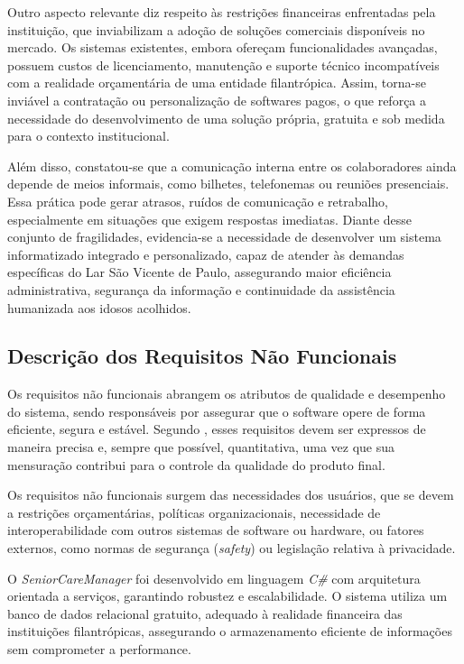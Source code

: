 Outro aspecto relevante diz respeito às restrições financeiras enfrentadas pela instituição, que inviabilizam a adoção de soluções comerciais disponíveis no mercado. Os sistemas existentes, embora ofereçam funcionalidades avançadas, possuem custos de licenciamento, manutenção e suporte técnico incompatíveis com a realidade orçamentária de uma entidade filantrópica. Assim, torna-se inviável a contratação ou personalização de softwares pagos, o que reforça a necessidade do desenvolvimento de uma solução própria, gratuita e sob medida para o contexto institucional.

Além disso, constatou-se que a comunicação interna entre os colaboradores ainda depende de meios informais, como bilhetes, telefonemas ou reuniões presenciais. Essa prática pode gerar atrasos, ruídos de comunicação e retrabalho, especialmente em situações que exigem respostas imediatas. Diante desse conjunto de fragilidades, evidencia-se a necessidade de desenvolver um sistema informatizado integrado e personalizado, capaz de atender às demandas específicas do Lar São Vicente de Paulo, assegurando maior eficiência administrativa, segurança da informação e continuidade da assistência humanizada aos idosos acolhidos.

\subsection{Descrição dos Requisitos Não Funcionais}

Os requisitos não funcionais abrangem os atributos de qualidade e desempenho do sistema, sendo responsáveis por assegurar que o software opere de forma eficiente, segura e estável. Segundo \textcite{PaulaFilho2015ES}, esses requisitos devem ser expressos de maneira precisa e, sempre que possível, quantitativa, uma vez que sua mensuração contribui para o controle da qualidade do produto final.

\begin{citacao}
	Os requisitos não funcionais surgem das necessidades dos usuários, que se devem a restrições orçamentárias, políticas organizacionais, necessidade de interoperabilidade com outros sistemas de software ou hardware, ou fatores externos, como normas de segurança (\textit{safety}) ou legislação relativa à privacidade. 
	\textcite[p.~91]{Sommerville2018ES10} 
\end{citacao}

O \textit{SeniorCareManager} foi desenvolvido em linguagem \textit{C\#} com arquitetura orientada a serviços, garantindo robustez e escalabilidade. O sistema utiliza um banco de dados relacional gratuito, adequado à realidade financeira das instituições filantrópicas, assegurando o armazenamento eficiente de informações sem comprometer a performance.  

